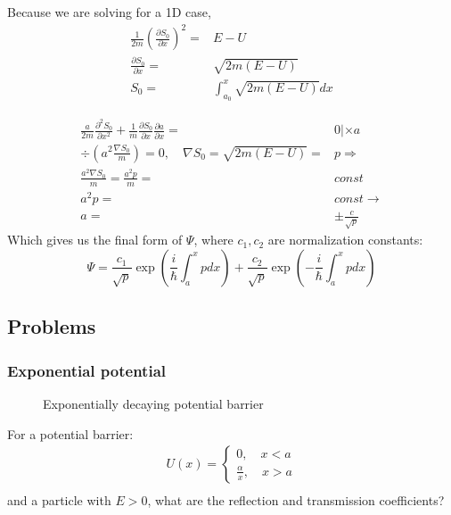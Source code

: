 		Because we are solving for a 1D case,
		\begin{align}
			\frac{1}{2m}\left(\frac{\partial S_0}{\partial x}\right)^2 =& E - U\\
			\frac{\partial S_0}{\partial x} =& \sqrt{2m(E-U)}\\
			S_0 =& \int_{a_0}^{x}\sqrt{2m(E-U)}dx
		\end{align}	
	
		\begin{align}
			\frac{a}{2m} \frac{\partial^2 S_0}{\partial x^2} + \frac{1}{m}\frac{\partial S_0}{\partial x}\frac{\partial a}{\partial x} =& 0 |\times a\\
			\div\left(a^2 \frac{\nabla S_0}{m}\right) = 0, \quad \nabla S_0 = \sqrt{2m(E-U)} =& p \Rightarrow\\
			\frac{a^2\nabla S_0}{m} = \frac{a^2p}{m} =& const \\
			a^2p =& const \rightarrow \\
			a =& \pm \frac{c}{\sqrt{p}}
		\end{align}
		Which gives us the final form of $\Psi$, where $c_1, c_2$ are normalization constants:
		\begin{equation}
			\Psi = \frac{c_1}{\sqrt{p}}\exp(\frac{i}{\hbar}\int_a^x pdx) + \frac{c_2}{\sqrt{p}}\exp(-\frac{i}{\hbar}\int_a^x pdx)
		\end{equation}
	
	\subsection{Problems}
		\subsubsection{Exponential potential}
			\begin{figure}[!h]
				\centering
				
				\caption{Exponentially decaying potential barrier}
			\end{figure}
			For a potential barrier:
			\begin{align}
				U(x) = \left\{ \begin{aligned}
					0,\quad x < a \\
					\frac{\alpha}{x},\quad x > a
				\end{aligned}
				\right. \\
			\end{align}
			and a particle with $E > 0$, what are the reflection and transmission coefficients?
			

